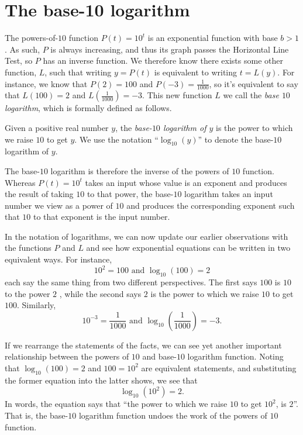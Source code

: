 \documentclass[nooutcomes]{ximera}
\begin{document}
\section{The base-10 logarithm}

The powers-of-\(10\) function \(P(t) = 10^t\) is an exponential function with base \(b > 1\).  As such, \(P\) is always increasing, and thus its graph passes the Horizontal Line Test, so \(P\) has an inverse function.  We therefore know there exists some other function, \(L\), such that writing \(y = P(t)\) is equivalent to writing \(t = L(y)\).  For instance, we know that \(P(2)=100\) and \(P(-3)=\frac{1}{1000}\), so it's equivalent to say that \(L(100) = 2\) and \(L\left(\frac{1}{1000}\right) = -3\).  This new function \(L\) we call the \emph{base \(10\) logarithm}, which is formally defined as follows.%

Given a positive real number \(y\), the \emph{base-\(10\) logarithm of \(y\)} is the power to which we raise \(10\) to get \(y\).  We use the notation ``\(\log_{10}(y)\)'' to denote the base-\(10\) logarithm of \(y\).%

The base-\(10\) logarithm is therefore the inverse of the powers of \(10\) function.  Whereas \(P(t) = 10^t\) takes an input whose value is an exponent and produces the result of taking \(10\) to that power, the base-\(10\) logarithm takes an input number we view as a power of \(10\) and produces the corresponding exponent such that \(10\) to that exponent is the input number.%

In the notation of logarithms, we can now update our earlier observations with the functions \(P\) and \(L\) and see how exponential equations can be written in two equivalent ways.  For instance,%
\begin{equation*}
10^2 = 100 \text{ and } \log_{10}(100) = 2\label{eq-exp-log-base-10-2}
\end{equation*}
each say the same thing from two different perspectives.  The first says \(100\) is \(10\) to the power \(2\) , while the second says \(2\) is the power to which we raise \(10\) to get \(100\).  Similarly,%
\begin{equation*}
10^{-3} = \frac{1}{1000} \text{ and } \log_{10} \left( \frac{1}{1000} \right) = -3\text{.}\label{eq-exp-log-base-10-minus-3}
\end{equation*}

If we rearrange the statements of the facts, we can see yet another important relationship between the powers of \(10\) and base-\(10\) logarithm function.  Noting that \(\log_{10}(100) = 2\) and \(100 = 10^2\) are equivalent statements, and substituting the former equation into the latter shows, we see that%
\begin{equation*}
\log_{10}(10^2) = 2\text{.}
\end{equation*}
In words, the equation says that ``the power to which we raise \(10\) to get \(10^2\), is \(2\)''.  That is, the base-\(10\) logarithm function undoes the work of the powers of \(10\) function.%
\end{document}
